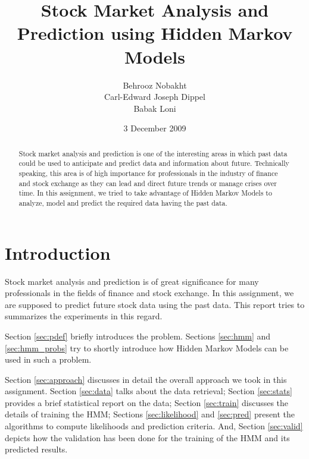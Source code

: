 \documentclass{acm_proc_article-sp}
\begin{document}
\title{Stock Market Analysis and Prediction using Hidden Markov Models}

\author{
  \alignauthor Behrooz Nobakht \\
  \alignauthor Carl-Edward Joseph Dippel\\
  \alignauthor Babak Loni\\
}

\date{3 December 2009}

\maketitle

\begin{abstract}
Stock market analysis and prediction is one of the interesting areas in which past data could be used to anticipate and
predict data and information about future. Technically speaking, this area is of high importance for professionals in
the industry of finance and stock exchange as they can lead and direct future trends or manage crises over time. In
this assignment, we tried to take advantage of Hidden Markov Models to analyze, model and predict the required data
having the past data.
\end{abstract}


\section{Introduction}
Stock market analysis and prediction is of great significance for many professionals in the fields of finance and stock
exchange. In this assignment, we are supposed to predict future stock data using the past data. This report tries to
summarizes the experiments in this regard.

Section \ref{sec:pdef} briefly introduces the problem. Sections \ref{sec:hmm} and \ref{sec:hmm_probs} try to shortly
introduce how Hidden Markov Models can be used in such a problem.

Section \ref{sec:approach} discusses in detail the overall approach we took in this assignment. Section \ref{sec:data}
talks about the data retrieval; Section \ref{sec:stats} provides a brief statistical report on the data; Section
\ref{sec:train} discusses the details of training the HMM; Sections \ref{sec:likelihood} and \ref{sec:pred} present
the algorithms to compute likelihoods and prediction criteria. And, Section \ref{sec:valid} depicts how the validation
has been done for the training of the HMM and its predicted results.
\end{document}
